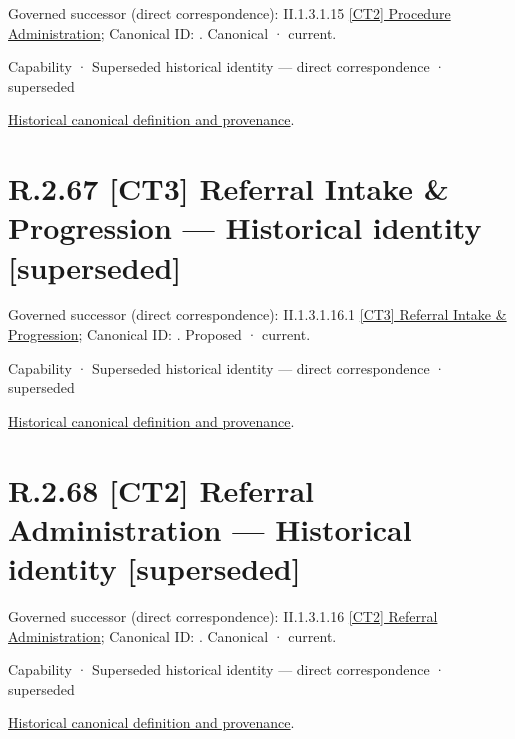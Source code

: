 {\small Governed successor (direct correspondence): II.1.3.1.15 \hyperref[element:649dd7cc26094e539386a050086dfb91]{[CT2] Procedure Administration}; Canonical ID: \texttt{}. Canonical · current.}\par
\label{element:466a4057001846bb8ae0481453d3e410}
{\small Capability · Superseded historical identity — direct correspondence · superseded}\par
\href{../../../../continuum/strategy/capability/466a4057001846bb8ae0481453d3e410.md}{Historical canonical definition and provenance}.\par
\section*{R.2.67 [CT3] Referral Intake \& Progression — Historical identity [superseded]}
\label{navigation:R.2.67}

{\small Governed successor (direct correspondence): II.1.3.1.16.1 \hyperref[element:d11bdb9464b2476894aa372ab9b929a7]{[CT3] Referral Intake \& Progression}; Canonical ID: \texttt{}. Proposed · current.}\par
\label{element:7180f6265d5c4687a001220c6126e301}
{\small Capability · Superseded historical identity — direct correspondence · superseded}\par
\href{../../../../continuum/strategy/capability/7180f6265d5c4687a001220c6126e301.md}{Historical canonical definition and provenance}.\par
\section*{R.2.68 [CT2] Referral Administration — Historical identity [superseded]}
\label{navigation:R.2.68}

{\small Governed successor (direct correspondence): II.1.3.1.16 \hyperref[element:ae0de25600ee416aa24d2a167b64f230]{[CT2] Referral Administration}; Canonical ID: \texttt{}. Canonical · current.}\par
\label{element:5b0ccf4b30054145952c298b348ed266}
{\small Capability · Superseded historical identity — direct correspondence · superseded}\par
\href{../../../../continuum/strategy/capability/5b0ccf4b30054145952c298b348ed266.md}{Historical canonical definition and provenance}.\par
